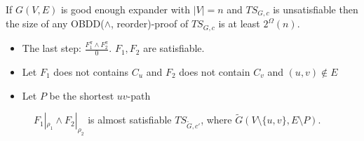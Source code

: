 {
\myth If $G(V,E)$ is good enough expander with $|V|=n$ and $TS_{G,c}$ is unsatisfiable then the size of any OBDD($\land$, reorder)-proof
of $TS_{G,c}$ is at least $2^\Omega(n)$.

\dok

\parbox{.45\textwidth}{
\begin{itemize}
\item The last step: $\frac{F_1^{\pi}\land F_2^{\pi}}{0}$. $F_1, F_2$ are satisfiable.
\item Let $F_1$ does not contains $C_u$ and $F_2$ does not contain $C_v$ and $(u,v)\notin E$
\item Let $P$ be the shortest $uv$-path
\end{itemize}
}
\parbox{.45\textwidth}{
\begin{figure}[ht]
\begin{center}
\end{center}
 $F_1|_{\rho_1} \land F_2|_{\rho_2}$ is almost satisfiable $TS_{\tilde G, c'}$, where $\tilde G(V\setminus\{u,v\},E\setminus P)$.

\end{figure}
}                     


}
